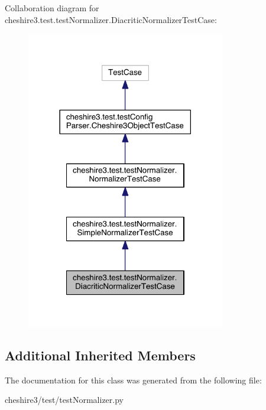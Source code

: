 Collaboration diagram for cheshire3.\-test.\-test\-Normalizer.\-Diacritic\-Normalizer\-Test\-Case\-:
\nopagebreak
\begin{figure}[H]
\begin{center}
\leavevmode
\includegraphics[width=246pt]{classcheshire3_1_1test_1_1test_normalizer_1_1_diacritic_normalizer_test_case__coll__graph}
\end{center}
\end{figure}
\subsection*{Additional Inherited Members}


The documentation for this class was generated from the following file\-:\begin{DoxyCompactItemize}
\item 
cheshire3/test/test\-Normalizer.\-py\end{DoxyCompactItemize}
